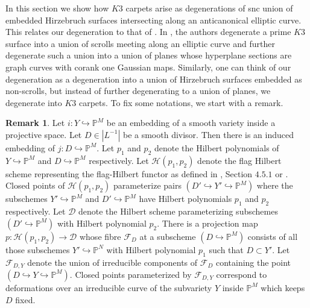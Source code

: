 \documentclass[11pt,twoside]{amsart}
\theoremstyle{plain}
\numberwithin{equation}{section}
\theoremstyle{definition}
\newtheorem{remark}[theorem]{Remark}
\begin{document}
\label{main results}

In this section we show how $K3$ carpets arise as degenerations of snc union of embedded Hirzebruch surfaces intersecting along an anticanonical elliptic curve. This relates our degeneration to that of \cite{CLM93}. In \cite{CLM93}, the authors degenerate a prime $K3$ surface into a union of scrolls meeting along an elliptic curve and further degenerate such a union into a union of planes whose hyperplane sections are graph curves with corank one Gaussian maps. Similarly, one can think of our degeneration as a degeneration into a union of Hirzebruch surfaces embedded as non-scrolls, but instead of further degenerating to a union of planes, we degenerate into $K3$ carpets. To fix some notations, we start with a remark.

\begin{remark}\label{flag hilbert schemes}
Let $i: Y \hookrightarrow \mathbb{P}^M$ be an embedding of a smooth variety inside a projective space. Let $D \in |L^{-1}|$ be a smooth divisor. Then there is an induced embedding of $j: D \hookrightarrow \mathbb{P}^M$. Let $p_1$ and $p_2$ denote the Hilbert polynomials of $Y \hookrightarrow \mathbb{P}^M$ and $D \hookrightarrow \mathbb{P}^M$ respectively. Let $\mathcal{H}(p_1, p_2)$ denote the flag Hilbert scheme representing the flag-Hilbert functor as defined in \cite{Ser}, Section $4.5.1$ or \cite{KL81}. Closed points of $\mathcal{H}(p_1, p_2)$ parameterize pairs $(D' \hookrightarrow Y' \hookrightarrow \mathbb{P}^M)$ where the subschemes $Y' \hookrightarrow \mathbb{P}^M$ and $D' \hookrightarrow \mathbb{P}^M$ have Hilbert polynomials $p_1$ and $p_2$ respectively. Let $\mathcal{D}$ denote the Hilbert scheme parameterizing subschemes $(D' \hookrightarrow \mathbb{P}^M)$ with Hilbert polynomial $p_2$. There is a projection map $p: \mathcal{H}(p_1, p_2) \to \mathcal{D}$ whose fibre $\mathcal{F}_D$ at a subscheme $(D \hookrightarrow \mathbb{P}^M)$ consists of all those subschemes $Y' \hookrightarrow \mathbb{P}^N$ with Hilbert polynomial $p_1$ such that $D \subset Y'$. Let $\mathcal F_{D,Y}$ denote the union of irreducible components of $\mathcal F_D$ containing the point $(D \hookrightarrow Y\hookrightarrow \mathbb{P}^M)$. Closed points parameterized by $\mathcal{F}_{D,Y}$ correspond to deformations over an irreducible curve of the subvariety $Y$ inside $\mathbb{P}^M$ which keeps $D$ fixed.     
\end{remark}
\end{document}
